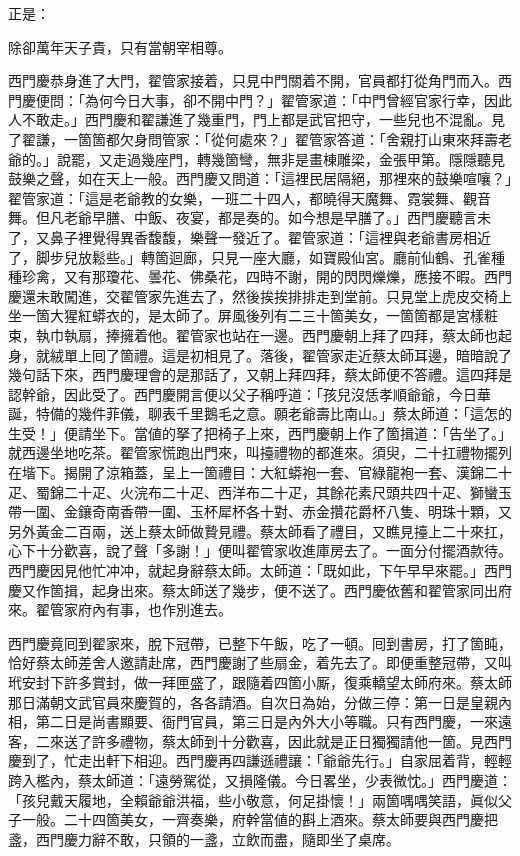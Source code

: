 正是：

\begin{myquote}
除卻萬年天子貴，只有當朝宰相尊。
\end{myquote}

西門慶恭身進了大門，翟管家接着，只見中門關着不開，{}官員都打從角門而入。西門慶便問：「為何今日大事，卻不開中門？」翟管家道：「中門曾經官家行幸，因此人不敢走。」西門慶和翟謙進了幾重門，門上都是武官把守，一些兒也不混亂。見了翟謙，一箇箇都欠身問管家：「從何處來？」翟管家答道：「舍親打山東來拜壽老爺的。」說罷，又走過幾座門，轉幾箇彎，無非是畫棟雕梁，金張甲第。隱隱聽見鼓樂之聲，如在天上一般。西門慶又問道：「這裡民居隔絕，那裡來的鼓樂喧嚷？」翟管家道：「這是老爺教的女樂，一班二十四人，都曉得天魔舞、霓裳舞、觀音舞。但凡老爺早膳、中飯、夜宴，都是奏的。如今想是早膳了。」{}西門慶聽言未了，又鼻子裡覺得異香馥馥，樂聲一發近了。翟管家道：「這裡與老爺書房相近了，脚步兒放鬆些。」轉箇迴廊，只見一座大廳，如寶殿仙宮。廳前仙鶴、孔雀種種珍禽，又有那瓊花、曇花、佛桑花，四時不謝，開的閃閃爍爍，應接不暇。西門慶還未敢闖進，交翟管家先進去了，然後挨挨排排走到堂前。只見堂上虎皮交椅上坐一箇大猩紅蟒衣的，是太師了。屏風後列有二三十箇美女，一箇箇都是宮樣粧束，執巾執扇，捧擁着他。翟管家也站在一邊。西門慶朝上拜了四拜，蔡太師也起身，就絨單上囘了箇禮。這是初相見了。落後，翟管家走近蔡太師耳邊，暗暗說了幾句話下來，西門慶理會的是那話了，又朝上拜四拜，蔡太師便不答禮。這四拜是認幹爺，因此受了。{}西門慶開言便以父子稱呼道：「孩兒沒恁孝順爺爺，今日華誕，特備的幾件菲儀，聊表千里鵝毛之意。願老爺壽比南山。」蔡太師道：「這怎的生受！」便請坐下。當値的拏了把椅子上來，西門慶朝上作了箇揖道：「告坐了。」就西邊坐地吃茶。翟管家慌跑出門來，叫擡禮物的都進來。須臾，二十扛禮物擺列在堦下。揭開了涼箱蓋，呈上一箇禮目：大紅蟒袍一套、官綠龍袍一套、漢錦二十疋、蜀錦二十疋、火浣布二十疋、西洋布二十疋，其餘花素尺頭共四十疋、獅蠻玉帶一圍、金鑲奇南香帶一圍、玉杯犀杯各十對、赤金攢花爵杯八隻、明珠十顆，又另外黃金二百兩，送上蔡太師做贄見禮。蔡太師看了禮目，又瞧見擡上二十來扛，心下十分歡喜，說了聲「多謝！」便叫翟管家收進庫房去了。一面分付擺酒款待。西門慶因見他忙冲冲，就起身辭蔡太師。太師道：「既如此，下午早早來罷。」西門慶又作箇揖，起身出來。蔡太師送了幾步，便不送了。{}西門慶依舊和翟管家同出府來。翟管家府內有事，也作別進去。

西門慶竟囘到翟家來，脫下冠帶，已整下午飯，吃了一頓。囘到書房，打了箇盹，恰好蔡太師差舍人邀請赴席，西門慶謝了些扇金，着先去了。即便重整冠帶，又叫玳安封下許多賞封，做一拜匣盛了，跟隨着四箇小厮，復乘轎望太師府來。蔡太師那日滿朝文武官員來慶賀的，各各請酒。自次日為始，分做三停：第一日是皇親內相，第二日是尚書顯要、衙門官員，第三日是內外大小等職。只有西門慶，一來遠客，二來送了許多禮物，蔡太師到十分歡喜，因此就是正日獨獨請他一箇。見西門慶到了，忙走出軒下相迎。西門慶再四謙遜禮讓：「爺爺先行。」自家屈着背，輕輕跨入檻內，蔡太師道：「遠勞駕從，又損隆儀。今日畧坐，少表微忱。」西門慶道：「孩兒戴天履地，全賴爺爺洪福，些小敬意，何足掛懷！」兩箇喁喁笑語，眞似父子一般。{}二十四箇美女，一齊奏樂，府幹當値的斟上酒來。蔡太師要與西門慶把盞，西門慶力辭不敢，只領的一盞，立飲而盡，隨即坐了桌席。

